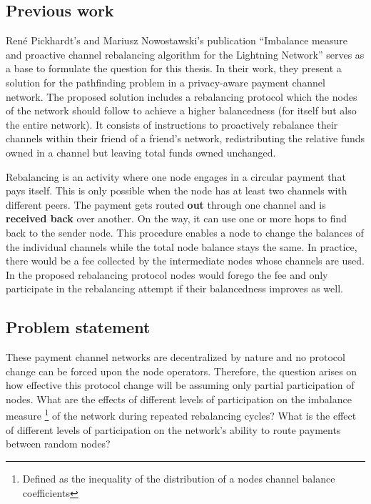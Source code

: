 \documentclass[final]{fhnwreport}       %
\begin{document}
\subsection{Previous work}
René Pickhardt's and Mariusz Nowostawski's publication ``Imbalance measure and proactive channel rebalancing algorithm for the Lightning Network'' \cite{pickhardt_imbalance_2019} serves as a base to formulate the question for this thesis. In their work, they present a solution for the pathfinding problem in a privacy-aware payment channel network. The proposed solution includes a rebalancing protocol which the nodes of the network should follow to achieve a higher balancedness (for itself but also the entire network). It consists of instructions to proactively rebalance their channels within their friend of a friend's network, redistributing the relative funds owned in a channel but leaving total funds owned unchanged.

Rebalancing is an activity where one node engages in a circular payment that pays itself. This is only possible when the node has at least two channels with different peers. The payment gets routed \textbf{out} through one channel and is \textbf{received back} over another. On the way, it can use one or more hops to find back to the sender node. This procedure enables a node to change the balances of the individual channels while the total node balance stays the same. In practice, there would be a fee collected by the intermediate nodes whose channels are used. In the proposed rebalancing protocol nodes would forego the fee and only participate in the rebalancing attempt if their balancedness improves as well.

\subsection{Problem statement}

These payment channel networks are decentralized by nature and no protocol change can be forced upon the node operators. Therefore, the question arises on how effective this protocol change will be assuming only partial participation of nodes. What are the effects of different levels of participation on the imbalance measure \footnote{Defined as the inequality of the distribution of a nodes channel balance coefficients} of the network during repeated rebalancing cycles? What is the effect of different levels of participation on the network's ability to route payments between random nodes? 
\end{document}
